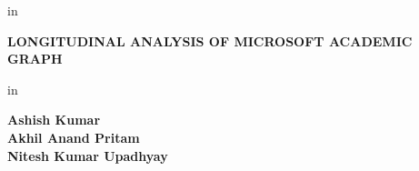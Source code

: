 \graphicspath{{CoverPage/Figures/}}

\begin{titlepage}
 in
\begin{center}
\LARGE \textbf{LONGITUDINAL ANALYSIS OF MICROSOFT ACADEMIC GRAPH}
\end{center}

 in

\begin{flushright}
\LARGE \textbf{Ashish Kumar\\
Akhil Anand Pritam
\\
Nitesh Kumar Upadhyay}
\end{flushright}


\end{titlepage}

\mbox{}
\thispagestyle{empty}
\newpage


